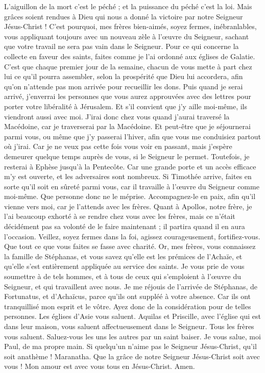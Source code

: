 \begin{multicols}{2}
L'aiguillon de la mort c'est le péché ; et la puissance du péché c'est la loi.
Mais grâces soient rendues à Dieu qui nous a donné la victoire par notre Seigneur Jésus-Christ !
C'est pourquoi, mes frères bien-aimés, soyez fermes, inébranlables, vous appliquant toujours avec un nouveau zèle à l’œuvre du Seigneur, sachant que votre travail ne sera pas vain dans le Seigneur.
\VerseOne{}Pour ce qui concerne la collecte en faveur des saints, faites comme je l’ai ordonné aux églises de Galatie.
C’est que chaque premier jour de la semaine, chacun de vous mette à part chez lui ce qu’il pourra assembler, selon la prospérité que Dieu lui accordera, afin qu’on n’attende pas mon arrivée pour recueillir les dons.
Puis quand je serai arrivé, j'enverrai les personnes que vous aurez approuvées avec des lettres pour porter votre libéralité à Jérusalem.
Et s’il convient que j’y aille moi-même, ils viendront aussi avec moi.
J'irai donc chez vous quand j’aurai traversé la Macédoine, car je traverserai par la Macédoine.
Et peut-être que je séjournerai parmi vous, ou même que j'y passerai l'hiver, afin que vous me conduisiez partout où j’irai.
Car je ne veux pas cette fois vous voir en passant, mais j’espère demeurer quelque temps auprès de vous, si le Seigneur le permet.
Toutefois, je resterai à Ephèse jusqu'à la Pentecôte.
Car une grande porte et un accès efficace m'y est ouverte, et les adversaires sont nombreux.
Si Timothée arrive, faites en sorte qu'il soit en sûreté parmi vous, car il travaille à l’œuvre du Seigneur comme moi-même.
Que personne donc ne le méprise. Accompagnez-le en paix, afin qu'il vienne vers moi, car je l'attends avec les frères.
Quant à Apollos, notre frère, je l'ai beaucoup exhorté à se rendre chez vous avec les frères, mais ce n’était décidément pas sa volonté de le faire maintenant ; il partira quand il en aura l’occasion.
Veillez, soyez fermes dans la foi, agissez courageusement, fortifiez-vous.
Que tout ce que vous faites se fasse avec charité.
Or, mes frères, vous connaissez la famille de Stéphanas, et vous savez qu'elle est les prémices de l'Achaïe, et qu’elle s’est entièrement appliquée au service des saints.
Je vous prie de vous soumettre à de tels hommes, et à tous de ceux qui s’emploient à l’œuvre du Seigneur, et qui travaillent avec nous.
Je me réjouis de l’arrivée de Stéphanas, de Fortunatus, et d’Achaïcus, parce qu'ils ont suppléé à votre absence.
Car ils ont tranquillisé mon esprit et le vôtre. Ayez donc de la considération pour de telles personnes.
Les églises d'Asie vous saluent. Aquilas et Priscille, avec l'église qui est dans leur maison, vous saluent affectueusement dans le Seigneur.
Tous les frères vous saluent. Saluez-vous les uns les autres par un saint baiser.
Je vous salue, moi Paul, de ma propre main.
Si quelqu'un n'aime pas le Seigneur Jésus-Christ, qu'il soit anathème ! Maranatha.
Que la grâce de notre Seigneur Jésus-Christ soit avec vous !
Mon amour est avec vous tous en Jésus-Christ. Amen.
\PPE{}
\end{multicols}
